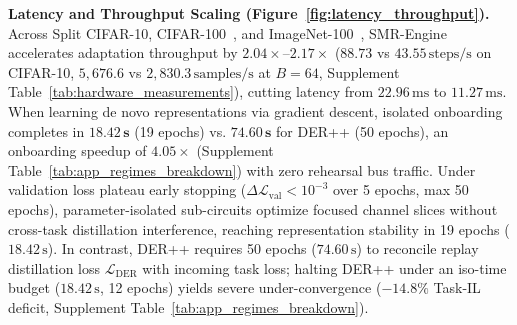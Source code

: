 \documentclass{article}
\begin{document}
\noindent\textbf{Latency and Throughput Scaling (Figure~\ref{fig:latency_throughput}).} Across Split CIFAR-10, CIFAR-100~\cite{krizhevsky2009learning}, and ImageNet-100~\cite{deng2009imagenet}, SMR-Engine accelerates adaptation throughput by $\mathbf{2.04\times\text{--}2.17\times}$ ($88.73$ vs $43.55\,\text{steps/s}$ on CIFAR-10, $5{,}676.6$ vs $2{,}830.3\,\text{samples/s}$ at $B=64$, Supplement Table~\ref{tab:hardware_measurements}), cutting latency from $22.96\,\text{ms}$ to $11.27\,\text{ms}$. When learning de novo representations via gradient descent, isolated onboarding completes in $\mathbf{18.42\,\text{s}}$ (19 epochs) vs. $\mathbf{74.60\,\text{s}}$ for DER++ (50 epochs), an onboarding speedup of $\mathbf{4.05\times}$ (Supplement Table~\ref{tab:app_regimes_breakdown}) with zero rehearsal bus traffic. Under validation loss plateau early stopping ($\Delta\mathcal{L}_{\mathrm{val}} < 10^{-3}$ over 5 epochs, max 50 epochs), parameter-isolated sub-circuits optimize focused channel slices without cross-task distillation interference, reaching representation stability in 19 epochs ($18.42\,\text{s}$). In contrast, DER++ requires 50 epochs ($74.60\,\text{s}$) to reconcile replay distillation loss $\mathcal{L}_{\mathrm{DER}}$ with incoming task loss; halting DER++ under an iso-time budget ($18.42\,\text{s}$, 12 epochs) yields severe under-convergence ($-14.8\%$ Task-IL deficit, Supplement Table~\ref{tab:app_regimes_breakdown}).

\begin{table}[!t]
\centering
\caption{\textbf{Zero-Gradient Normalization Revival Across Edge and Server Backbones}. $\mathcal{O}(1)$ Recalibration ($K=20$, $<0.7\,\text{s}$, $|\mathcal{M}|=0$) revives dead channels without exemplar buffers across triplicate seeds (\texttt{[42, 1337, 2025]}).}
\label{tab:zero_grad_revival}
\vskip -0.01in
\end{table}
\end{document}
